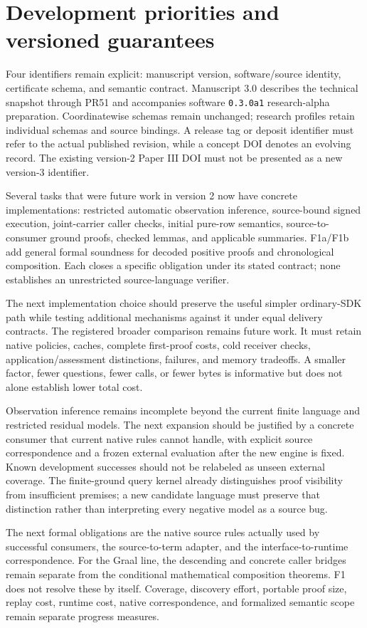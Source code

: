 \section{Development priorities and versioned guarantees}\label{sec:evolution}

Four identifiers remain explicit: manuscript version, software/source identity, certificate schema, and semantic contract. Manuscript 3.0 describes the technical snapshot through PR51 and accompanies software \texttt{0.3.0a1} research-alpha preparation. Coordinatewise schemas remain unchanged; research profiles retain individual schemas and source bindings. A release tag or deposit identifier must refer to the actual published revision, while a concept DOI denotes an evolving record. The existing version-2 Paper III DOI must not be presented as a new version-3 identifier.

Several tasks that were future work in version 2 now have concrete implementations: restricted automatic observation inference, source-bound signed execution, joint-carrier caller checks, initial pure-row semantics, source-to-consumer ground proofs, checked lemmas, and applicable summaries. F1a/F1b add general formal soundness for decoded positive proofs and chronological composition. Each closes a specific obligation under its stated contract; none establishes an unrestricted source-language verifier.

The next implementation choice should preserve the useful simpler ordinary-SDK path while testing additional mechanisms against it under equal delivery contracts. The registered broader comparison remains future work. It must retain native policies, caches, complete first-proof costs, cold receiver checks, application/assessment distinctions, failures, and memory tradeoffs. A smaller factor, fewer questions, fewer calls, or fewer bytes is informative but does not alone establish lower total cost.

Observation inference remains incomplete beyond the current finite language and restricted residual models. The next expansion should be justified by a concrete consumer that current native rules cannot handle, with explicit source correspondence and a frozen external evaluation after the new engine is fixed. Known development successes should not be relabeled as unseen external coverage. The finite-ground query kernel already distinguishes proof visibility from insufficient premises; a new candidate language must preserve that distinction rather than interpreting every negative model as a source bug.

The next formal obligations are the native source rules actually used by successful consumers, the source-to-term adapter, and the interface-to-runtime correspondence. For the Graal line, the descending and concrete caller bridges remain separate from the conditional mathematical composition theorems. F1 does not resolve these by itself. Coverage, discovery effort, portable proof size, replay cost, runtime cost, native correspondence, and formalized semantic scope remain separate progress measures.
